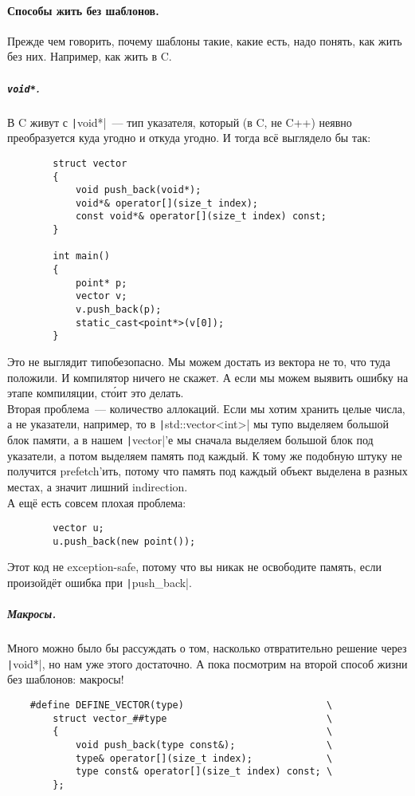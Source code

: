 \documentclass{article}
\begin{document}
    \paragraph{Способы жить без шаблонов.}
    Прежде чем говорить, почему шаблоны такие, какие есть, надо понять, как жить без них. Например, как жить в C.
    \subparagraph{\texttt{void*}.}
    В C живут с \texttt|void*|~--- тип указателя, который (в C, не C++) неявно преобразуется куда угодно и откуда угодно. И тогда всё выглядело бы так:
    \begin{verbatim}
        struct vector
        {
            void push_back(void*);
            void*& operator[](size_t index);
            const void*& operator[](size_t index) const;
        }

        int main()
        {
            point* p;
            vector v;
            v.push_back(p);
            static_cast<point*>(v[0]);
        }
    \end{verbatim}
    Это не выглядит типобезопасно. Мы можем достать из вектора не то, что туда положили. И компилятор ничего не скажет. А если мы можем выявить ошибку на этапе компиляции, ст\'{о}ит это делать.\\
    Вторая проблема~--- количество аллокаций. Если мы хотим хранить целые числа, а не указатели, например, то в \texttt|std::vector<int>| мы тупо выделяем большой блок памяти, а в нашем \texttt|vector|'е мы сначала выделяем большой блок под указатели, а потом выделяем память под каждый. К тому же подобную штуку не получится prefetch'ить, потому что память под каждый объект выделена в разных местах, а значит лишний indirection.\\
    А ещё есть совсем плохая проблема:
    \begin{verbatim}
        vector u;
        u.push_back(new point());
    \end{verbatim}
    Этот код не exception-safe, потому что вы никак не освободите память, если произойдёт ошибка при \texttt|push_back|.
    \subparagraph{Макросы.}
    Много можно было бы рассуждать о том, насколько отвратительно решение через \texttt|void*|, но нам уже этого достаточно. А пока посмотрим на второй способ жизни без шаблонов: макросы!
    \begin{verbatim}
    #define DEFINE_VECTOR(type)                         \
        struct vector_##type                            \
        {                                               \
            void push_back(type const&);                \
            type& operator[](size_t index);             \
            type const& operator[](size_t index) const; \
        };
    \end{verbatim}
\end{document}
